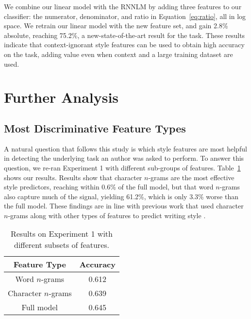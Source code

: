 \documentclass[11pt,a4paper]{article}
\newcommand{\tabref}[1]{Table~\ref{#1}}
\newcommand{\isection}[2]{\section{#1}\label{ssec:#2}}
\newcommand{\com}[1]{}
\newcommand{\resolved}[1]{}
\newcommand{\roy}[1]{{\color{orange}\textsc{[#1 --rs]}}}
\newcommand{\nascomment}[1]{{\color{blue}\textsc{[#1 --nas]}}}
\renewcommand{\roy}[1]{{\color{orange}[#1 --rs]}}
\renewcommand{\roy}[1]{#1}
\renewcommand{\nascomment}[1]{}
\begin{document}
We combine our linear model with the RNNLM by adding three features to
our classifier: the numerator, denominator, and ratio in
Equation~\ref{eq:ratio}, all in log space. %
We retrain our linear  model with the new feature set, and gain 2.8\%
absolute, reaching 75.2\%\com{ (15.3\% better than the published state-of-the-art\com{ and 4.1\% better than the best unpublished} result)}\roy{, a new-state-of-the-art result for the task.}\resolved{\roy{As now the codalab shared task table contains our numbers, I removed the references to these works, and left only the footnote earlier which says that there are higher, unpublished numbers.}}
These results indicate that context-ignorant style features can be used to obtain high
accuracy on the task, adding value even when context and a large
training dataset are used.  \resolved{\nascomment{check reframing here}}




\isection{Further Analysis}{Ablation}

 \resolved{\nascomment{these aren't just ablations, so I retitled}}

\subsection{Most Discriminative Feature Types}
A natural question that follows this study is which style features are most
helpful in detecting the underlying task an author was asked
to perform. 
To answer this question, we re-ran Experiment 1 with different sub-groups of features. 
\tabref{subgroups} shows our results. Results show that  character $n$-grams are the most effective style predictors, reaching within  0.6\% of the full model, but that word $n$-grams also capture much of the signal, yielding 61.2\%, which is only 3.3\% worse than the full model. 
These findings are in line with previous work that used character $n$-grams along with other types of features to predict writing  style \cite{Schwartz:2013}.


\begin{table}[!t]
\begin{center}
\begin{tabular}{|c|c|} \hline
{\bf Feature Type} & {\bf Accuracy}\\ \hline
Word $n$-grams & 0.612 \\ \hline
Character $n$-grams & 0.639 \\ \hline
Full model & 0.645 \\ \hline

\end{tabular}
\end{center}
\caption{\label{subgroups}
Results on Experiment 1 with different subsets of features.
}
\end{table}
\end{document}
